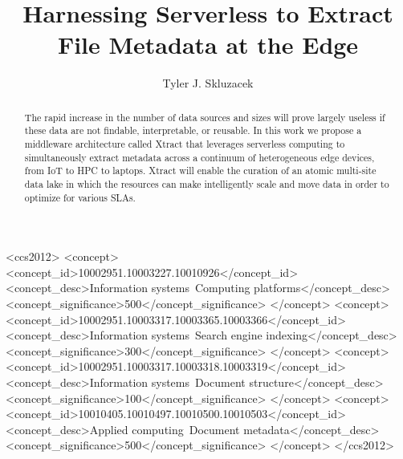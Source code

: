 \documentclass[sigconf]{acmart}
\newcommand{\tyler}[1]{}
\newcommand{\kyle}[1]{}
\newcommand{\tyler}[1]{{\textcolor{cyan}{ tyler: #1 }}}
\newcommand{\kyle}[1]{{\textcolor{purple}{ Kyle: #1 }}}
\begin{document}
\title{Harnessing Serverless to Extract File Metadata at the Edge}


\author{Tyler J. Skluzacek} 



\renewcommand{\shortauthors}{Skluzacek et al.}

\begin{abstract}
\tyler{max 100 words}

\tyler{GRAND-er. be more dramatic. }
\kyle{Maybe here you could say. Lots of data. Its created and stored in different places. 
We need to rethink the siloed and antiquated file system approach and instead think
of data in one global index of metadata (i.e., a data ocean -- just made up this term, not sure
if I like it). To do this we need to be able extract metadata
from where data exists. We propose a fluid, serverless middleware in which extractors
are dynamically determined and executed wherever it makes most
sense (e.g., at the edge, cloud, computing center, ...)}

The rapid increase in the number of data sources and sizes will prove largely 
useless if these data are not findable, interpretable, or reusable. In this work 
we propose a middleware architecture called Xtract that leverages serverless 
computing to simultaneously extract metadata across a continuum of heterogeneous edge 
devices, from IoT to HPC to 
laptops. Xtract will enable the curation of an atomic multi-site data lake in which the
resources can make intelligently scale and move data in order to optimize for various 
SLAs.


\end{abstract}

\begin{CCSXML}
<ccs2012>
<concept>
<concept_id>10002951.10003227.10010926</concept_id>
<concept_desc>Information systems~Computing platforms</concept_desc>
<concept_significance>500</concept_significance>
</concept>
<concept>
<concept_id>10002951.10003317.10003365.10003366</concept_id>
<concept_desc>Information systems~Search engine indexing</concept_desc>
<concept_significance>300</concept_significance>
</concept>
<concept>
<concept_id>10002951.10003317.10003318.10003319</concept_id>
<concept_desc>Information systems~Document structure</concept_desc>
<concept_significance>100</concept_significance>
</concept>
<concept>
<concept_id>10010405.10010497.10010500.10010503</concept_id>
<concept_desc>Applied computing~Document metadata</concept_desc>
<concept_significance>500</concept_significance>
</concept>
</ccs2012>
\end{CCSXML}
\end{document}
